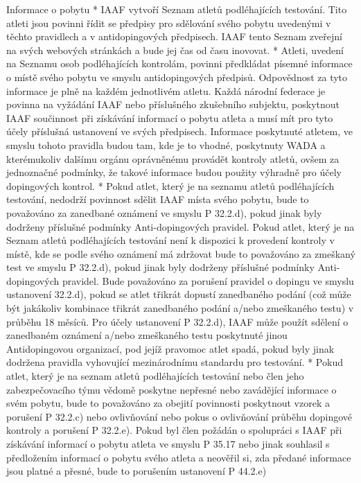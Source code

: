 Informace o pobytu
* IAAF vytvoří Seznam atletů podléhajících testování. Tito atleti jsou povinni řídit se předpisy pro sdělování svého pobytu uvedenými v těchto pravidlech a v antidopingových předpisech. IAAF tento Seznam zveřejní na svých webových stránkách a bude jej čas od času inovovat.
* Atleti, uvedení na Seznamu osob podléhajících kontrolám, povinni předkládat písemné informace o místě svého pobytu ve smyslu antidopingových předpisů. Odpovědnost za tyto informace je plně na každém jednotlivém atletu. Každá národní federace je povinna na vyžádání IAAF nebo příslušného zkušebního subjektu, poskytnout IAAF součinnost při získávání informací o pobytu atleta a musí mít pro tyto účely příslušná ustanovení ve svých předpisech. Informace poskytnuté atletem, ve smyslu tohoto pravidla budou tam, kde je to vhodné, poskytnuty WADA a kterémukoliv dalšímu orgánu oprávněnému provádět kontroly atletů, ovšem za jednoznačné podmínky, že takové informace budou použity výhradně pro účely dopingových kontrol.
* Pokud atlet, který je na seznamu atletů podléhajících testování, nedodrží povinnost sdělit IAAF místa svého pobytu, bude to považováno za zanedbané oznámení ve smyslu P 32.2.d), pokud jinak byly dodrženy příslušné podmínky Anti-dopingových pravidel. Pokud atlet, který je na Seznam atletů podléhajících testování není k dispozici k provedení kontroly v místě, kde se podle svého oznámení má zdržovat bude to považováno za zmeškaný test ve smyslu P 32.2.d), pokud jinak byly dodrženy příslušné podmínky Anti-dopingových pravidel. Bude považováno za porušení pravidel o dopingu ve smyslu ustanovení 32.2.d), pokud se atlet třikrát dopustí zanedbaného podání (což může být jakákoliv kombinace třikrát zanedbaného podání a/nebo zmeškaného testu) v průběhu 18 měsíců. Pro účely ustanovení P 32.2.d), IAAF může použít sdělení o zanedbaném oznámení a/nebo zmeškaného testu poskytnuté jinou Antidopingovou organizací, pod jejíž pravomoc atlet spadá, pokud byly jinak dodržena pravidla vyhovující mezinárodnímu standardu pro testování.
* Pokud atlet, který je na seznam atletů podléhajících testování nebo člen jeho zabezpečovacího týmu vědomě poskytne nepřesné nebo zavádějící informace o svém pobytu, bude to považováno za obejití povinnosti poskytnout vzorek a porušení P 32.2.c) nebo ovlivňování nebo pokus o ovlivňování průběhu dopingové kontroly a porušení P 32.2.e). Pokud byl člen požádán o spolupráci s IAAF při získávání informací o pobytu atleta ve smyslu P 35.17 nebo jinak souhlasil s předložením informací o pobytu svého atleta a neověřil si, zda předané informace jsou platné a přesné, bude to porušením ustanovení P 44.2.e)

